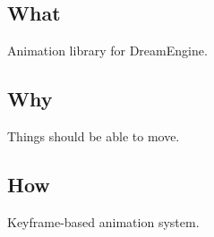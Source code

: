 \subsection*{What}

Animation library for Dream\+Engine.

\subsection*{Why}


\begin{DoxyItemize}
\item Things should be able to move.
\end{DoxyItemize}

\subsection*{How}


\begin{DoxyItemize}
\item Keyframe-\/based animation system. 
\end{DoxyItemize}